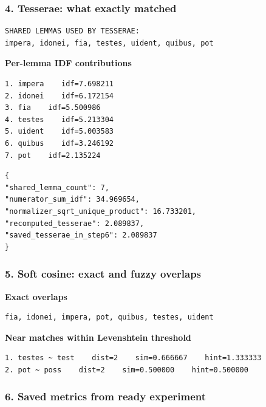 \subsubsection{4. Tesserae: what exactly matched}

\begin{lstlisting}[breaklines=true,basicstyle=\ttfamily\small]
SHARED LEMMAS USED BY TESSERAE:
impera, idonei, fia, testes, uident, quibus, pot
\end{lstlisting}

\textbf{Per-lemma IDF contributions} 

\begin{lstlisting}[breaklines=true,basicstyle=\ttfamily\small]
1. impera    idf=7.698211
2. idonei    idf=6.172154
3. fia    idf=5.500986
4. testes    idf=5.213304
5. uident    idf=5.003583
6. quibus    idf=3.246192
7. pot    idf=2.135224
\end{lstlisting}

\begin{lstlisting}[breaklines=true,basicstyle=\ttfamily\small,language={}]
{
"shared_lemma_count": 7,
"numerator_sum_idf": 34.969654,
"normalizer_sqrt_unique_product": 16.733201,
"recomputed_tesserae": 2.089837,
"saved_tesserae_in_step6": 2.089837
}
\end{lstlisting}

\subsubsection{5. Soft cosine: exact and fuzzy overlaps}

\textbf{Exact overlaps} 

\begin{lstlisting}[breaklines=true,basicstyle=\ttfamily\small]
fia, idonei, impera, pot, quibus, testes, uident
\end{lstlisting}

\textbf{Near matches within Levenshtein threshold} 

\begin{lstlisting}[breaklines=true,basicstyle=\ttfamily\small]
1. testes ~ test    dist=2    sim=0.666667    hint=1.333333
2. pot ~ poss    dist=2    sim=0.500000    hint=0.500000
\end{lstlisting}

\subsubsection{6. Saved metrics from ready experiment}

